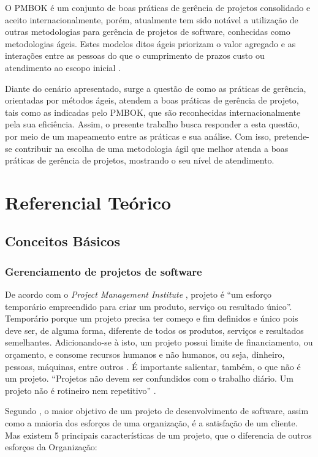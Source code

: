 \documentclass[
    12pt,               %
    openright,          %
    twoside,            %
    a4paper,            %
    chapter=TITLE,     %
    english,            %
    spanish,            %
    portuguese              %
    ]{abntex2}
\newcommand\dblquote[1]{\textquotedblleft #1\textquotedblright}
\begin{document}
O PMBOK é um conjunto de boas práticas de gerência de projetos consolidado e aceito internacionalmente, porém, atualmente tem sido notável a utilização de outras metodologias para gerência de projetos de software, conhecidas como metodologias ágeis. Estes modelos ditos ágeis priorizam o valor agregado e as interações entre as pessoas do que o cumprimento de prazos custo ou atendimento ao escopo inicial \cite[p.~xxi]{prikladnickiAtAll}.

Diante do cenário apresentado, surge a questão de como as práticas de gerência, orientadas por métodos ágeis, atendem a boas práticas de gerência de projeto, tais como as indicadas pelo PMBOK, que são reconhecidas internacionalmente pela sua eficiência. Assim, o presente trabalho busca responder a esta questão, por meio de um mapeamento  entre as práticas e sua análise. Com isso, pretende-se contribuir na escolha de uma metodologia ágil que melhor atenda a boas práticas de gerência de projetos, mostrando o seu nível de atendimento.


\chapter{Referencial Teórico}

\section{Conceitos Básicos}

\subsection{Gerenciamento de projetos de software}

De acordo com o \textit{Project Management Institute} \cite{pmi2013}, projeto é \dblquote{um esforço temporário empreendido para criar um produto, serviço ou resultado único}. Temporário porque um projeto precisa ter começo e fim definidos e único pois deve ser, de alguma forma, diferente de todos os produtos, serviços e resultados semelhantes. Adicionando-se à isto, um projeto possui limite de financiamento, ou orçamento, e consome recursos humanos e não humanos, ou seja, dinheiro, pessoas, máquinas, entre outros \cite[p.~2]{kerzner2011}. É importante salientar, também, o que não é um projeto. \dblquote{Projetos não devem ser confundidos com o trabalho diário. Um projeto não é rotineiro nem repetitivo} \cite[p.~6]{grayLarson2009}.

Segundo , o maior objetivo de um projeto de desenvolvimento de software, assim como a maioria dos esforços de uma organização, é a satisfação de um cliente. Mas existem 5 principais características de um projeto, que o diferencia de outros esforços da Organização: 
\end{document}
